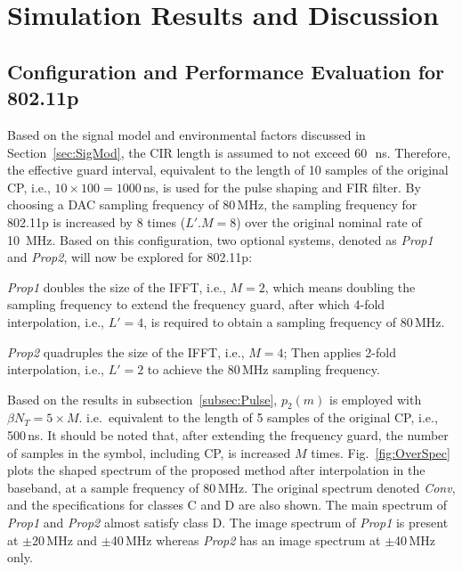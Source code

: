 \section{Simulation Results and Discussion}
\subsection{Configuration and Performance Evaluation for 802.11p}
Based on the signal model and environmental factors discussed in Section~\ref{sec:SigMod}, the CIR length is assumed to not exceed 60\,~ns.
Therefore, the effective guard interval, equivalent to the length of 10 samples of the original CP, i.e., $10 \times 100=1000$\,ns, is used for the pulse shaping and FIR filter.
By choosing a DAC sampling frequency of 80\,MHz, the sampling frequency for 802.11p is increased by 8 times ($L'.M = 8$) over the original nominal rate of 10~MHz.
Based on this configuration, two optional systems, denoted as \emph{Prop1} and \emph{Prop2}, will now be explored for 802.11p:

\emph{Prop1} doubles the size of the IFFT, i.e., $M=2$, which means doubling the sampling frequency to extend the frequency guard, after which 4-fold interpolation, i.e., $L'=4$, is required to obtain a sampling frequency of 80\,MHz.

\emph{Prop2} quadruples the size of the IFFT, i.e., $M=4$; Then applies 2-fold interpolation, i.e., $L'=2$ to achieve the 80\,MHz sampling frequency.

Based on the results in subsection~\ref{subsec:Pulse}, $p_2(m)$ is employed with $\beta N_{T}=5 \times M$. i.e.\ equivalent to the length of 5 samples of the original CP, i.e., 500\,ns.
It should be noted that, after extending the frequency guard, the number of samples in the symbol, including CP, is increased $M$ times.
Fig.~\ref{fig:OverSpec} plots the shaped spectrum of the proposed method after interpolation in the baseband, at a sample frequency of 80\,MHz.
The original spectrum denoted \emph{Conv}, and the specifications for classes C and D are also shown.
The main spectrum of \emph{Prop1} and \emph{Prop2} almost satisfy class D.
The image spectrum of \emph{Prop1} is present at $\pm$20\,MHz and $\pm$40\,MHz whereas \emph{Prop2} has an image spectrum at $\pm$40\,MHz only.

